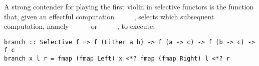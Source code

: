 
A strong contender for playing the first violin in selective functors is the
function  that, given an effectful computation
~\hs{::}~~~~, selects which subsequent
computation, namely ~\hs{::}~~\hs{(}~\hs{->}~ or
~\hs{::}~~\hs{(}~\hs{->}~, to execute:

\vspace{1mm}
\begin{verbatim}
branch :: Selective f => f (Either a b) -> f (a -> c) -> f (b -> c) -> f c
branch x l r = fmap (fmap Left) x <*? fmap (fmap Right) l <*? r
\end{verbatim}
\vspace{1mm}
\newpage

